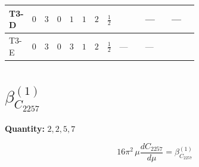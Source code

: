 \documentclass[8pt]{article}
\begin{document}
\begin{landscape}
\begin{longtable}{@{}llcccccc >{\raggedright\arraybackslash}p{0.21\linewidth} >{\raggedright\arraybackslash}p{0.21\linewidth} >{\raggedright\arraybackslash}p{0.21\linewidth}@{}}
\midrule
T3-D & $0$ & $3$ & $0$ & $1$ & $1$ & $2$ & $\frac{1}{2}$ & \scriptsize\adjustbox{max width=\linewidth}{$\begin{gathered} - \frac{2 \sqrt{3} lambdaT_{3} \overline{y_{1}} \overline{y_{2}}}{3 MF}\end{gathered}$} & --- & --- \\
\midrule
T3-E & $0$ & $3$ & $0$ & $3$ & $1$ & $2$ & $\frac{1}{2}$ & --- & --- & \scriptsize\adjustbox{max width=\linewidth}{$\begin{gathered} \frac{2 \sqrt{6} lambdaT_{3} \overline{y_{1}} \overline{y_{2}}}{3 MF}\end{gathered}$} \\
\midrule
\bottomrule
\end{longtable}
\clearpage
\section*{$\beta_{C_{2257}}^{(1)}$}
\noindent\textbf{Quantity: }$\mathrm{2,2,5,7}$\par\smallskip
\[16\pi^2\,\mu\frac{d C_{2257}}{d\mu}=\beta_{C_{2257}}^{(1)}\]

\end{landscape}
\end{document}
